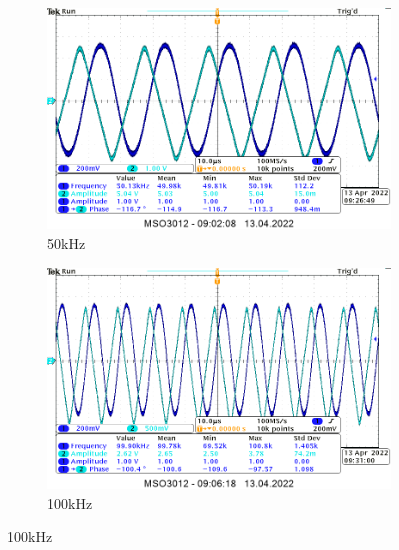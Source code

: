 \begin{itemize}
{        \begin{figure}[H]
            \centering
            \begin{subfigure}[h]{0.4\textwidth}
                \includegraphics[width=\textwidth]{img/osciloscope/charakterystyka/1_50khz_cropped.png}
                \caption*{50kHz}
            \end{subfigure}
            \begin{subfigure}[h]{0.4\textwidth}
                \includegraphics[width=\textwidth]{img/osciloscope/charakterystyka/1_100khz_cropped.png}
                \caption*{100kHz}
            \end{subfigure}
        \end{figure}
        
}
\end{itemize}
